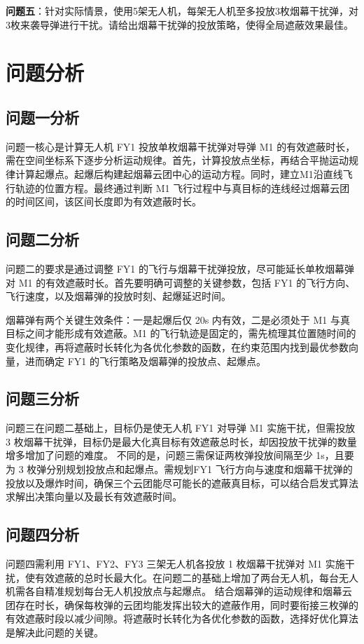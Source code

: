 \documentclass[withoutpreface]{cumcmthesis}
\begin{document}
\textbf{问题五}：针对实际情景，使用5架无人机，每架无人机至多投放3枚烟幕干扰弹，对3枚来袭导弹进行干扰。请给出烟幕干扰弹的投放策略，使得全局遮蔽效果最佳。
\section{问题分析}
\subsection{问题一分析}
问题一核心是计算无人机 FY1 投放单枚烟幕干扰弹对导弹 M1 的有效遮蔽时长，需在空间坐标系下逐步分析运动规律。首先，计算投放点坐标，再结合平抛运动规律计算起爆点。起爆后构建起烟幕云团中心的运动方程。同时，建立M1沿直线飞行轨迹的位置方程。最终通过判断 M1 飞行过程中与真目标的连线经过烟幕云团的时间区间，该区间长度即为有效遮蔽时长。
\subsection{问题二分析}
问题二的要求是通过调整 FY1 的飞行与烟幕干扰弹投放，尽可能延长单枚烟幕弹对 M1 的有效遮蔽时长。首先要明确可调整的关键参数，包括 FY1 的飞行方向、飞行速度，以及烟幕弹的投放时刻、起爆延迟时间。

烟幕弹有两个关键生效条件：一是起爆后仅 20s 内有效，二是必须处于 M1 与真目标之间才能形成有效遮蔽。M1 的飞行轨迹是固定的，需先梳理其位置随时间的变化规律，再将遮蔽时长转化为各优化参数的函数，在约束范围内找到最优参数向量，进而确定 FY1 的飞行策略及烟幕弹的投放点、起爆点。

\subsection{问题三分析}
问题三在问题二基础上，目标仍是使无人机 FY1 对导弹 M1 实施干扰，但需投放 3 枚烟幕干扰弹，目标仍是最大化真目标有效遮蔽总时长，却因投放干扰弹的数量增多增加了问题的难度。
不同的是，问题三需保证两枚弹投放间隔至少 1s，且要为 3 枚弹分别规划投放点和起爆点。需规划FY1 飞行方向与速度和烟幕干扰弹的投放以及爆炸时间，确保三个云团能尽可能长的遮蔽真目标，可以结合启发式算法求解出决策向量以及最长有效遮蔽时间。

\subsection{问题四分析}
问题四需利用 FY1、FY2、FY3 三架无人机各投放 1 枚烟幕干扰弹对 M1 实施干扰，使有效遮蔽的总时长最大化。在问题二的基础上增加了两台无人机，每台无人机需各自精准规划每台无人机投放点与起爆点。
结合烟幕弹的运动规律和烟幕云团存在时长，确保每枚弹的云团均能发挥出较大的遮蔽作用，同时要衔接三枚弹的有效遮蔽时段以减少间隙。将遮蔽时长转化为各优化参数的函数，选择好优化算法是解决此问题的关键。
\end{document}

